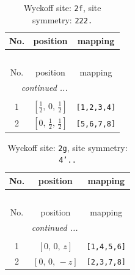 \documentclass[fleqn,8pt]{jsarticle}
\begin{document}
\renewcommand{\arraystretch}{1.2}
\begin{longtable}{ccc}
\caption{Wyckoff site: {\tt 2f}, site symmetry: {\tt 222.}}
 \\
 \hline \hline
No. & position & mapping \\ \hline \endfirsthead

\multicolumn{2}{l}{\tablename\ \thetable{}} \\
 \hline \hline
No. & position & mapping \\ \hline \endhead

 \hline \hline
\multicolumn{2}{r}{\footnotesize\it continued ...} \\ \endfoot

 \hline \hline
\multicolumn{2}{r}{} \\ \endlastfoot

1 & $\left[ \frac{1}{2},\, 0,\, \frac{1}{2} \right]$ & {\tt [1,2,3,4]} \\ \hline
2 & $\left[ 0,\, \frac{1}{2},\, \frac{1}{2} \right]$ & {\tt [5,6,7,8]} \\
\end{longtable}
\renewcommand{\arraystretch}{1.2}
\begin{longtable}{ccc}
\caption{Wyckoff site: {\tt 2g}, site symmetry: {\tt 4'..}}
 \\
 \hline \hline
No. & position & mapping \\ \hline \endfirsthead

\multicolumn{2}{l}{\tablename\ \thetable{}} \\
 \hline \hline
No. & position & mapping \\ \hline \endhead

 \hline \hline
\multicolumn{2}{r}{\footnotesize\it continued ...} \\ \endfoot

 \hline \hline
\multicolumn{2}{r}{} \\ \endlastfoot

1 & $\left[ 0,\, 0,\, z \right]$ & {\tt [1,4,5,6]} \\ \hline
2 & $\left[ 0,\, 0,\, - z \right]$ & {\tt [2,3,7,8]} \\
\end{longtable}
\renewcommand{\arraystretch}{1.2}
\end{document}
